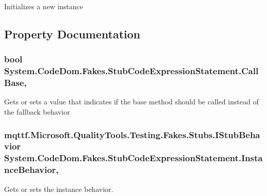 Initializes a new instance



\subsection{Property Documentation}
\hypertarget{class_system_1_1_code_dom_1_1_fakes_1_1_stub_code_expression_statement_a6264aad7c387512ff8ffdc572c38436a}{
\subsubsection[{Call\-Base}]{\setlength{\rightskip}{0pt plus 5cm}bool System.\-Code\-Dom.\-Fakes.\-Stub\-Code\-Expression\-Statement.\-Call\-Base\hspace{0.3cm}{\ttfamily [get]}, {\ttfamily [set]}}}\label{class_system_1_1_code_dom_1_1_fakes_1_1_stub_code_expression_statement_a6264aad7c387512ff8ffdc572c38436a}


Gets or sets a value that indicates if the base method should be called instead of the fallback behavior

\hypertarget{class_system_1_1_code_dom_1_1_fakes_1_1_stub_code_expression_statement_ad30d6ce0ff42272d1b09adaf37bd3957}{
\subsubsection[{Instance\-Behavior}]{\setlength{\rightskip}{0pt plus 5cm}mqttf.\-Microsoft.\-Quality\-Tools.\-Testing.\-Fakes.\-Stubs.\-I\-Stub\-Behavior System.\-Code\-Dom.\-Fakes.\-Stub\-Code\-Expression\-Statement.\-Instance\-Behavior\hspace{0.3cm}{\ttfamily [get]}, {\ttfamily [set]}}}\label{class_system_1_1_code_dom_1_1_fakes_1_1_stub_code_expression_statement_ad30d6ce0ff42272d1b09adaf37bd3957}


Gets or sets the instance behavior.

